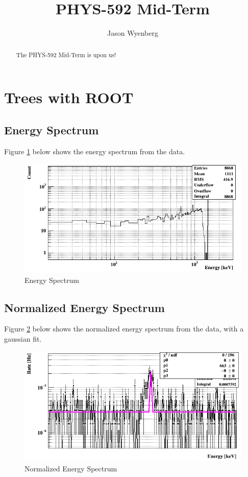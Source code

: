 \documentclass[letterpaper]{article}
\title{PHYS-592 Mid-Term}
\author{Jason Wyenberg}
\begin{document}
\maketitle
\begin{abstract}
The PHYS-592 Mid-Term is upon us!
\end{abstract}
\section{Trees with ROOT}
\subsection{Energy Spectrum}
Figure \ref{Figure1} below shows the energy spectrum from the data.
\begin{figure}[htpb]
  \centering
  \includegraphics[width=.8\linewidth]{Figure1}
  \caption{Energy Spectrum}
  \label{Figure1}
\end{figure}
\subsection{Normalized Energy Spectrum}
Figure \ref{Figure2} below shows the normalized energy spectrum from the data, with a gaussian fit.
\begin{figure}[htpb]
  \centering
  \includegraphics[width=.8\linewidth]{Figure2}
  \caption{Normalized Energy Spectrum}
  \label{Figure2}
\end{figure}
\end{document}

